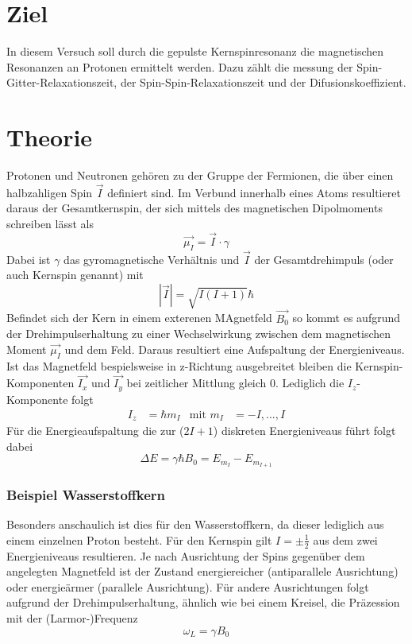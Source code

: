 \section{Ziel}
In diesem Versuch soll durch die gepulste Kernspinresonanz die magnetischen Resonanzen an Protonen ermittelt werden.
Dazu zählt die messung der Spin-Gitter-Relaxationszeit, der Spin-Spin-Relaxationszeit und der Difusionskoeffizient.

\section{Theorie}
Protonen und Neutronen gehören zu der Gruppe der Fermionen, die über einen halbzahligen Spin $\vec{I}$ definiert sind.
Im Verbund innerhalb eines Atoms resultieret daraus der Gesamtkernspin, der sich mittels des magnetischen
Dipolmoments schreiben lässt als
\begin{equation}
    \vec{\mu_I}=\vec{I}\cdot\gamma
\end{equation}
Dabei ist $\gamma$ das gyromagnetische Verhältnis und $\vec{I}$ der Gesamtdrehimpuls (oder auch Kernspin genannt) mit
\begin{equation}
    |\vec{I}|=\sqrt{I(I+1)}\hbar
\end{equation}
Befindet sich der Kern in einem exterenen MAgnetfeld $\vec{B_0}$ so kommt es aufgrund der Drehimpulserhaltung zu einer
Wechselwirkung zwischen dem magnetischen Moment $\vec{\mu_I}$ und dem Feld.
Daraus resultiert eine Aufspaltung der Energieniveaus.\\
Ist das Magnetfeld bespielsweise in z-Richtung ausgebreitet bleiben die Kernspin-Komponenten
$\vec{I_x}$ und $\vec{I_y}$ bei zeitlicher Mittlung gleich $0$. Lediglich die $I_z$-Komponente folgt
\begin{align}
    I_z&=\hbar m_I &\text{mit } m_I&=-I,...,I
\end{align} 
Für die Energieaufspaltung die zur ($2I+1$) diskreten Energieniveaus führt folgt dabei
\begin{equation}
    \Delta E=\gamma \hbar B_0=E_{m_I}-E_{m_{I+1}}
\end{equation}
\subsubsection*{Beispiel Wasserstoffkern}
Besonders anschaulich ist dies für den Wasserstoffkern, da dieser lediglich aus einem einzelnen Proton besteht.
Für den Kernspin gilt $I=\pm\frac{1}{2}$ aus dem zwei Energieniveaus resultieren.
Je nach Ausrichtung der Spins gegenüber dem angelegten Magnetfeld ist der Zustand energiereicher (antiparallele Ausrichtung)
oder energieärmer (parallele Ausrichtung). Für andere Ausrichtungen folgt aufgrund der Drehimpulserhaltung, ähnlich wie bei einem Kreisel, die
Präzession mit der (Larmor-)Frequenz 
\begin{equation}
    \omega_L=\gamma B_0
\end{equation}


